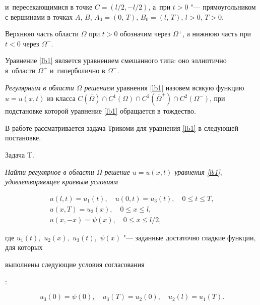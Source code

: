 и~пересекающимися в точке $C=(l/2, -l/2)$, а~при ${t>0}$ "--- прямоугольником с вершинами в точках $A$, $B$, $A_0=(0,\,T)$, ${B_0=(l,\,T)}$, $l>0$, $T>0$.

Верхнюю часть области $\Omega$ при $t>0$ обозначим через $\Omega^{+}$, а нижнюю часть при $t<0$ через $\Omega^{-}$.



Уравнение \eqref{lb1} является уравнением смешанного типа:  оно эллиптично в~области $\Omega^{+}$ и~гиперболично в $\Omega^{-}$. 



{\it Регулярным в области $\Omega$ решением} уравнения \eqref{lb1} назовем всякую функцию $u=u(x,t)$ из класса $C(\overline{\Omega})\cap C^1(\Omega)\cap C^2(\overline{\Omega}^{+})\cap C^2(\Omega^{-})$, при подстановке которой уравнение \eqref{lb1} обращается в тождество.



В работе рассматривается задача Трикоми для уравнения \eqref{lb1} в следующей постановке. 




\hypertarget{taskT}{}



{\small\sc Задача T.} {\it Найти регулярное в области $\Omega$ решение $u=u(x,t)$ уравнения \eqref{lb1}$,$ удовлетворяющее краевым условиям

\begin{gather}

\label{lb2}

u(l, t)=u_1 (t),\quad u(0, t)=u_3 (t),\quad 0 \leqslant t\leqslant T,

\\

\label{lb3}

u(x, T)=u_2 (x),\quad 0 \le x \le l,

\\

\label{lb4}

u(x,-x)=\psi (x),\quad 0 \le x\leqslant l/2,

\end{gather}

где $u_1(t),$ $u_2(x),$ $u_3(t),$ $\psi(x)$ "--- заданные достаточно гладкие функции$,$ для которых

 выполнены следующие условия  согласования}\/: 

$$u_3(0)=\psi(0),\quad u_3(T)=u_2(0),\quad  u_2(l)=u_1(T).$$





